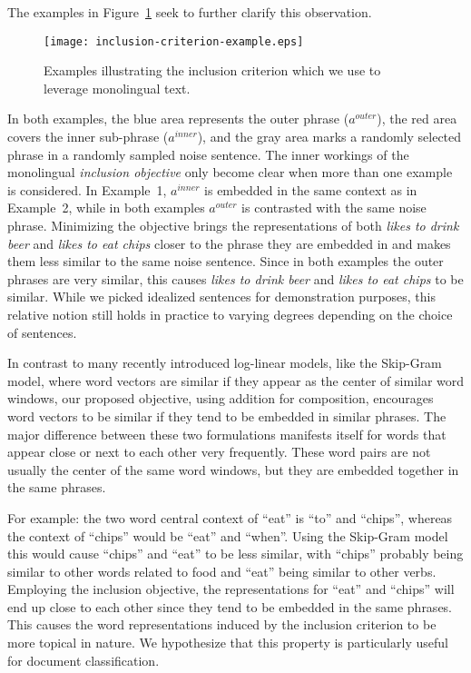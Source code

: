\documentclass{article} \usepackage{iclr2015,times}
\begin{document}
The examples in Figure~\ref{fig:inclusion-examples} seek to further clarify
this observation.
\begin{figure}[t]
    \begin{center}
        \texttt{[image: inclusion-criterion-example.eps]}
    \end{center}
    \caption{Examples illustrating the inclusion criterion which we use to leverage
    monolingual text.}
    \label{fig:inclusion-examples}
\end{figure}
In both examples, the blue area represents the outer phrase ($a^{outer}$),
the red area covers the inner sub-phrase ($a^{inner}$), and the gray area
marks a randomly selected phrase in a randomly sampled noise sentence.
The inner workings of the monolingual \emph{inclusion objective} only become
clear when more than one example is considered.
In Example~1, $a^{inner}$ is embedded in the same context as in
Example~2, while in both examples $a^{outer}$ is contrasted with the same noise
phrase.
Minimizing the objective brings the representations of both
\emph{likes to drink beer} and \emph{likes to eat chips} closer to the phrase
they are embedded in and makes them less similar to the same noise sentence.
Since in both examples the outer phrases are very similar, this causes
\emph{likes to drink beer} and \emph{likes to eat chips} to be
similar.
While we picked idealized sentences for demonstration purposes, this relative
notion still holds in practice to varying degrees depending on the choice
of sentences.

In contrast to many recently introduced log-linear models, like the Skip-Gram
model, where word vectors are similar if they appear as the center of similar
word windows, our proposed objective, using addition for composition, encourages
word vectors to be similar if they tend to be embedded in similar phrases.
The major difference between these two formulations manifests itself for words
that appear close or next to each other very frequently.
These word pairs are not usually the center of the same word windows,
but they are embedded together in the same phrases.

For example: the two word central context of ``eat'' is ``to'' and
``chips'', whereas the context of ``chips'' would be ``eat'' and ``when''.
Using the Skip-Gram model this would cause ``chips'' and ``eat'' to be
less similar, with ``chips'' probably being similar to other words related to
food and ``eat'' being similar to other verbs.
Employing the inclusion objective, the representations for ``eat'' and
``chips'' will end up close to each other since they tend to be embedded in the
same phrases.
This causes the word representations induced by the inclusion criterion to be
more topical in nature.
We hypothesize that this property is particularly useful for document
classification.
\end{document}
